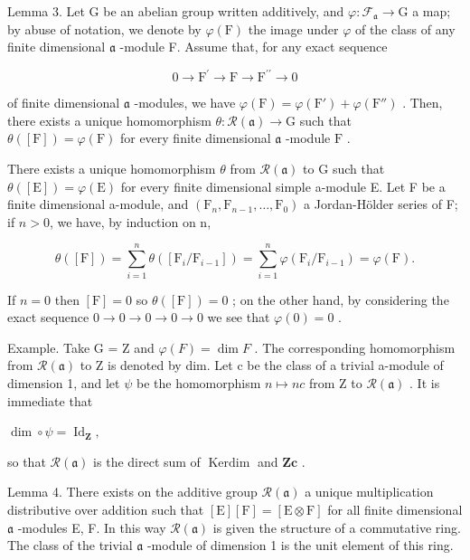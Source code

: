 Lemma 3. Let G be an abelian group written additively, and \(\varphi : \mathcal{F}_{\mathfrak{a}} \to \mathrm{G}\) a map; by abuse of notation, we denote by \(\varphi(\mathrm{F})\) the image under \(\varphi\) of the class of any finite dimensional \(\mathfrak{a}\) -module F. Assume that, for any exact sequence

\[
0 \longrightarrow \mathrm{F} ^ {\prime} \longrightarrow \mathrm{F} \longrightarrow \mathrm{F} ^ {\prime \prime} \longrightarrow 0
\]

of finite dimensional \(\mathfrak{a}\) -modules, we have \(\varphi(\mathrm{F}) = \varphi(\mathrm{F}') + \varphi(\mathrm{F}'')\) . Then, there exists a unique homomorphism \(\theta: \mathcal{R}(\mathfrak{a}) \to \mathrm{G}\) such that \(\theta([\mathrm{F}]) = \varphi(\mathrm{F})\) for every finite dimensional \(\mathfrak{a}\) -module \(\mathrm{F}\) .

There exists a unique homomorphism \(\theta\) from \(\mathcal{R}(\mathfrak{a})\) to G such that \(\theta([\mathrm{E}]) = \varphi(\mathrm{E})\) for every finite dimensional simple a-module E. Let F be a finite dimensional a-module, and \((\mathrm{F}_{n}, \mathrm{F}_{n-1}, \ldots, \mathrm{F}_{0})\) a Jordan-Hölder series of F; if \(n > 0\), we have, by induction on n,

\[
\theta ([ \mathrm{F} ]) = \sum_ {i = 1} ^ {n} \theta ([ \mathrm{F} _ {i} / \mathrm{F} _ {i - 1} ]) = \sum_ {i = 1} ^ {n} \varphi (\mathrm{F} _ {i} / \mathrm{F} _ {i - 1}) = \varphi (\mathrm{F}).
\]

If \(n = 0\) then \([\mathrm{F}] = 0\) so \(\theta([\mathrm{F}]) = 0\) ; on the other hand, by considering the exact sequence \(0 \longrightarrow 0 \longrightarrow 0 \longrightarrow 0 \longrightarrow 0\) we see that \(\varphi(0) = 0\) .

Example. Take G = Z and \(\varphi(F) = \dim F\) . The corresponding homomorphism from \(\mathcal{R}(\mathfrak{a})\) to Z is denoted by dim. Let c be the class of a trivial a-module of dimension 1, and let \(\psi\) be the homomorphism \(n \mapsto nc\) from Z to \(\mathcal{R}(\mathfrak{a})\) . It is immediate that

\(\dim \circ \psi = \operatorname{Id}_{\mathbf{Z}},\)

so that \(\mathcal{R}(\mathfrak{a})\) is the direct sum of \(\operatorname{Kerdim}\) and \(\mathbf{Zc}\) .

Lemma 4. There exists on the additive group \(\mathcal{R}(\mathfrak{a})\) a unique multiplication distributive over addition such that \([\mathrm{E}][\mathrm{F}] = [\mathrm{E}\otimes \mathrm{F}]\) for all finite dimensional \(\mathfrak{a}\) -modules E, F. In this way \(\mathcal{R}(\mathfrak{a})\) is given the structure of a commutative ring. The class of the trivial \(\mathfrak{a}\) -module of dimension 1 is the unit element of this ring.


